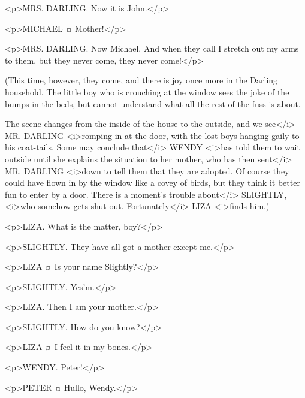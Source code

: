 \begin{drama}
<p>MRS. DARLING. Now it is John.</p>

<p>MICHAEL ¤
Mother!</p>

<p>MRS. DARLING. Now Michael. And when they call I stretch out my arms to them, but they never come, they never come!</p>

\begin{stagedir}
(This time, however, they come, and there is joy once more in the Darling household. The little boy who is crouching at the window sees the joke of the bumps in the beds, but cannot understand what all the rest of the fuss is about.

The scene changes from the inside of the house to the outside, and we see</i> MR. DARLING <i>romping in at the door, with the lost boys hanging gaily to his coat-tails. Some may conclude that</i> WENDY <i>has told them to wait outside until she explains the situation to her mother, who has then sent</i> MR. DARLING <i>down to tell them that they are adopted. Of course they could have flown in by the window like a covey of birds, but they think it better fun to enter by a door. There is a moment's trouble about</i> SLIGHTLY, <i>who somehow gets shut out. Fortunately</i> LIZA <i>finds him.)
\end{stagedir}

<p>LIZA. What is the matter, boy?</p>

<p>SLIGHTLY. They have all got a mother except me.</p>

<p>LIZA ¤
Is your name Slightly?</p>

<p>SLIGHTLY. Yes'm.</p>

<p>LIZA. Then I am your mother.</p>

<p>SLIGHTLY. How do you know?</p>

<p>LIZA ¤
I feel it in my bones.</p>


<p>WENDY. Peter!</p>

<p>PETER ¤
Hullo, Wendy.</p>


\end{drama}
